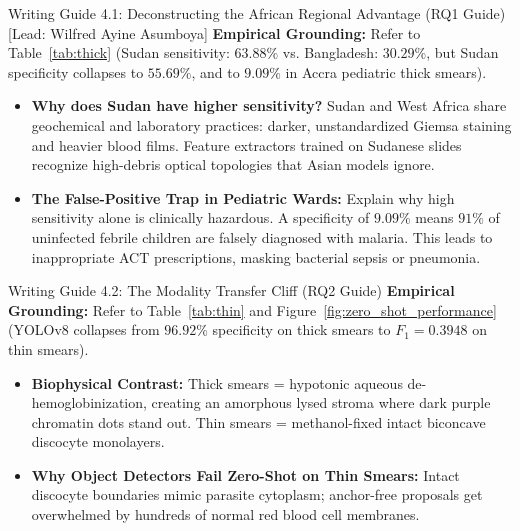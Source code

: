 \documentclass[a4paper,11pt]{article}
\begin{document}
\vspace{0.4em}

\begin{guidebox}{Writing Guide 4.1: Deconstructing the African Regional Advantage (RQ1 Guide) [Lead: Wilfred Ayine Asumboya]}
\textbf{Empirical Grounding:} Refer to Table~\ref{tab:thick} (Sudan sensitivity: $63.88\%$ vs. Bangladesh: $30.29\%$, but Sudan specificity collapses to $55.69\%$, and to $9.09\%$ in Accra pediatric thick smears).
\begin{itemize}\itemsep1.5pt
    \item \textbf{Why does Sudan have higher sensitivity?} Sudan and West Africa share geochemical and laboratory practices: darker, unstandardized Giemsa staining and heavier blood films. Feature extractors trained on Sudanese slides recognize high-debris optical topologies that Asian models ignore.
    \item \textbf{The False-Positive Trap in Pediatric Wards:} Explain why high sensitivity alone is clinically hazardous. A specificity of $9.09\%$ means $91\%$ of uninfected febrile children are falsely diagnosed with malaria. This leads to inappropriate ACT prescriptions, masking bacterial sepsis or pneumonia.
\end{itemize}
\end{guidebox}

\begin{guidebox}{Writing Guide 4.2: The Modality Transfer Cliff (RQ2 Guide)}
\textbf{Empirical Grounding:} Refer to Table~\ref{tab:thin} and Figure~\ref{fig:zero_shot_performance} (YOLOv8 collapses from $96.92\%$ specificity on thick smears to $F_1 = 0.3948$ on thin smears).
\begin{itemize}\itemsep1.5pt
    \item \textbf{Biophysical Contrast:} Thick smears = hypotonic aqueous de-hemoglobinization, creating an amorphous lysed stroma where dark purple chromatin dots stand out. Thin smears = methanol-fixed intact biconcave discocyte monolayers.
    \item \textbf{Why Object Detectors Fail Zero-Shot on Thin Smears:} Intact discocyte boundaries mimic parasite cytoplasm; anchor-free proposals get overwhelmed by hundreds of normal red blood cell membranes.
\end{itemize}
\end{guidebox}
\end{document}
